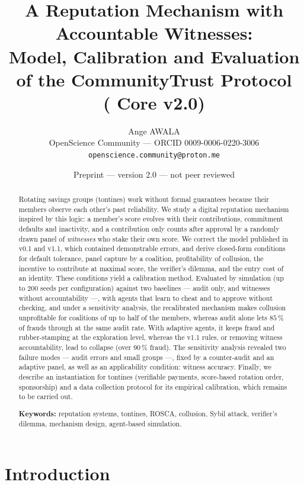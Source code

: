 \documentclass[11pt,a4paper]{article}
\title{\textbf{A Reputation Mechanism with Accountable Witnesses:\\
Model, Calibration and Evaluation of the CommunityTrust Protocol\\(\CTP{} Core v2.0)}}
\author{Ange AWALA\\
\small OpenScience Community --- ORCID 0009-0006-0220-3006\\
\small \texttt{openscience.community@proton.me}}
\date{\small Preprint --- version 2.0 --- not peer reviewed}
\theoremstyle{plain}
\theoremstyle{definition}
\theoremstyle{remark}
\newcommand{\1}{\mathbf{1}}
\begin{document}
\maketitle

\begin{abstract}
\noindent
Rotating savings groups (tontines) work without formal guarantees because
their members observe each other's past reliability. We study a digital
reputation mechanism inspired by this logic: a member's score evolves with
their contributions, commitment defaults and inactivity, and a contribution
only counts after approval by a randomly drawn panel of \emph{witnesses} who
stake their own score. We correct the model published in v0.1 and v1.1, which
contained demonstrable errors, and derive closed-form conditions for default
tolerance, panel capture by a coalition, profitability of collusion, the
incentive to contribute at maximal score, the verifier's dilemma, and the entry
cost of an identity. These conditions yield a calibration method. Evaluated by
simulation (up to 200 seeds per configuration) against two baselines ---
audit only, and witnesses without accountability ---, with agents that learn to
cheat and to approve without checking, and under a sensitivity analysis, the
recalibrated mechanism makes collusion unprofitable for coalitions of up to
half of the members, whereas audit alone lets $85\,\%$ of frauds through at
the same audit rate. With adaptive agents, it keeps fraud and rubber-stamping at
the exploration level, whereas the v1.1 rules, or removing witness
accountability, lead to collapse (over $90\,\%$ fraud). The sensitivity
analysis revealed two failure modes --- audit errors and small groups ---,
fixed by a counter-audit and an adaptive panel, as well as an applicability
condition: witness accuracy. Finally, we describe an instantiation for
tontines (verifiable payments, score-based rotation order, sponsorship) and a
data collection protocol for its empirical calibration, which remains to be
carried out.

\medskip\noindent
\textbf{Keywords:} reputation systems, tontines, ROSCA, collusion, Sybil
attack, verifier's dilemma, mechanism design, agent-based simulation.
\end{abstract}

\section{Introduction}
\end{document}
